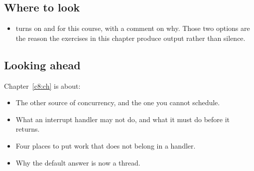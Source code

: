 \subsection*{Where to look}
\begin{itemize}
  \item {} turns on  and
     for this course, with a comment on why. Those two options are
    the reason the exercises in this chapter produce output rather than silence.
\end{itemize}

\subsection*{Looking ahead}
Chapter~\ref{c8:ch} is about:
\begin{itemize}
  \item The other source of concurrency, and the one you cannot schedule.
  \item What an interrupt handler may not do, and what it must do before it returns.
  \item Four places to put work that does not belong in a handler.
  \item Why the default answer is now a thread.
\end{itemize}
